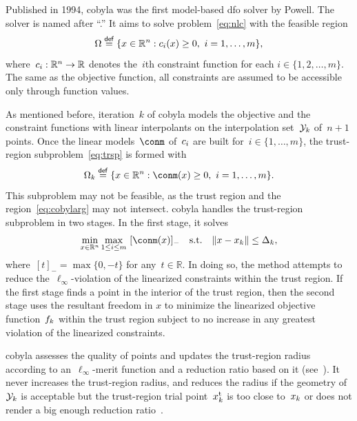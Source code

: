 \documentclass[manuscript,screen,review]{acmart}
\numberwithin{equation}{section}
\newcommand*{\R}{\mathbb{R}}
\newcommand*{\con}[1][i]{c\ifthenelse{\equal{#1}{}}{}{_{#1}}}
\newcommand*{\eqdef}{\mathrel{\stackrel{\mathsf{def}}{=}}}
\newcommand*{\fsetm}[1][k]{\Omega_{#1}}
\newcommand*{\fset}{\Omega}
\newcommand*{\iter}[1][k]{x\ifthenelse{\equal{#1}{}}{}{_{#1}}}
\newcommand*{\norm}[2][]{#1\lVert#2#1\rVert}
\newcommand*{\objm}[1][k]{\obj\ifthenelse{\equal{#1}{}}{}{_{#1}}}
\newcommand*{\obj}{f}
\newcommand*{\rad}[1][k]{\Delta\ifthenelse{\equal{#1}{}}{}{_{#1}}}
\newcommand*{\set}[2][]{#1\{#2#1\}}
\newcommand*{\st}{\text{s.t.}}
\newcommand*{\trust}{{\text{t}}}
\newcommand*{\xpt}[1][k]{\mathcal{Y}\ifthenelse{\equal{#1}{}}{}{_{#1}}}
\begin{document}
Published in 1994, \gls{cobyla} was the first model-based \gls{dfo} solver by Powell.
The solver is named after ``.''
It aims to solve problem~\eqref{eq:nlc} with the feasible region
\begin{equation*}
    \fset \eqdef \set{x \in \R^n : \con(x) \ge 0, ~ i = 1, \dots, m},
\end{equation*}
where~$\con : \R^n \to \R$ denotes the~$i$th constraint function for each $i \in \set{1, 2, \dots, m}$.
The same as the objective function, all constraints are assumed to be accessible only through function values.

As mentioned before, iteration~$k$ of \gls{cobyla} models the objective and the constraint functions with linear interpolants on the interpolation set~$\xpt$ of~$n + 1$ points.
Once the linear models~$\conm$ of~$\con$ are built for~$i \in \set{1, \dots, m}$, the trust-region subproblem~\eqref{eq:trsp} is formed with
\begin{equation}
    \label{eq:cobylarg}
    \fsetm \eqdef \set{x \in \R^n : \conm(x) \ge 0, ~ i=1, \dots, m}.
\end{equation}
This subproblem may not be feasible, as the trust region and the region~\eqref{eq:cobylarg} may not intersect.
\Gls{cobyla} handles the trust-region subproblem in two stages.
In the first stage, it solves
\begin{equation*}
    \min_{x \in \R^n}  \max_{1 \le i \le m} ~ [\conm(x)]_{-} \quad \st \quad \norm{x - \iter} \le \rad,
\end{equation*}
where~$[t]_{-} = \max \set{0, -t}$ for any~$t \in \R$.
In doing so, the method attempts to reduce the~$\ell_{\infty}$-violation of the linearized constraints within the trust region.
If the first stage finds a point in the interior of the trust region, then the second stage uses the resultant freedom in $x$ to minimize the linearized objective function~$\objm$ within the trust region subject to no increase in any greatest violation of the linearized constraints.

\Gls{cobyla} assesses the quality of points and updates the trust-region radius according to an~$\ell_\infty$-merit function and a reduction ratio based on it (see~\cite[equations~(5),~(9), and~(10)]{Powell_1994}).
It never increases the trust-region radius, and reduces the radius if the geometry of~$\xpt$ is acceptable but the trust-region trial point~$\iter^\trust$ is too close to~$\iter$ or does not render a big enough reduction ratio~\cite[equation~(11)]{Powell_1994}.
\end{document}
